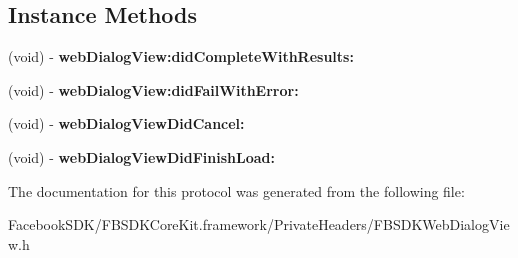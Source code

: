 \subsection*{Instance Methods}
\begin{DoxyCompactItemize}
\item 
\hypertarget{protocol_f_b_s_d_k_web_dialog_view_delegate-p_a323d5a451c107b6c5934cafa698cac33}{(void) -\/ {\bfseries web\-Dialog\-View\-:did\-Complete\-With\-Results\-:}}\label{protocol_f_b_s_d_k_web_dialog_view_delegate-p_a323d5a451c107b6c5934cafa698cac33}

\item 
\hypertarget{protocol_f_b_s_d_k_web_dialog_view_delegate-p_a520990f8c5dd5d68b5e13d02adbb38ce}{(void) -\/ {\bfseries web\-Dialog\-View\-:did\-Fail\-With\-Error\-:}}\label{protocol_f_b_s_d_k_web_dialog_view_delegate-p_a520990f8c5dd5d68b5e13d02adbb38ce}

\item 
\hypertarget{protocol_f_b_s_d_k_web_dialog_view_delegate-p_a992b224fa0cf17ad3d220c0c70e72de8}{(void) -\/ {\bfseries web\-Dialog\-View\-Did\-Cancel\-:}}\label{protocol_f_b_s_d_k_web_dialog_view_delegate-p_a992b224fa0cf17ad3d220c0c70e72de8}

\item 
\hypertarget{protocol_f_b_s_d_k_web_dialog_view_delegate-p_a73fbdcdee13ecc4a18f0280233e8fd74}{(void) -\/ {\bfseries web\-Dialog\-View\-Did\-Finish\-Load\-:}}\label{protocol_f_b_s_d_k_web_dialog_view_delegate-p_a73fbdcdee13ecc4a18f0280233e8fd74}

\end{DoxyCompactItemize}


The documentation for this protocol was generated from the following file\-:\begin{DoxyCompactItemize}
\item 
Facebook\-S\-D\-K/\-F\-B\-S\-D\-K\-Core\-Kit.\-framework/\-Private\-Headers/F\-B\-S\-D\-K\-Web\-Dialog\-View.\-h\end{DoxyCompactItemize}
